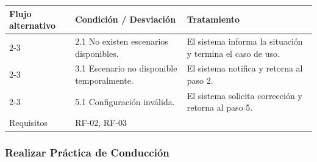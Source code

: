 \documentclass[12pt]{article}
\begin{document}
\begin{table}[H]
{\begin{tabular}{|p{3cm}|p{5.2cm}|p{5.5cm}|}
\multirow{3}{*}{\raggedright Flujo alternativo}
& \textbf{Condición / Desviación} & \textbf{Tratamiento} \\ \cline{2-3}
& 2.1 No existen escenarios disponibles. & El sistema informa la situación y termina el caso de uso. \\ \cline{2-3}
& 3.1 Escenario no disponible temporalmente. & El sistema notifica y retorna al paso 2. \\ \cline{2-3}
& 5.1 Configuración inválida. & El sistema solicita corrección y retorna al paso 5. \\ \hline

Requisitos & \multicolumn{2}{p{11cm}|}{RF-02, RF-03} \\ \hline
\end{tabular}
}
\end{table}

\subsubsection{Realizar Práctica de Conducción}
\end{document}
